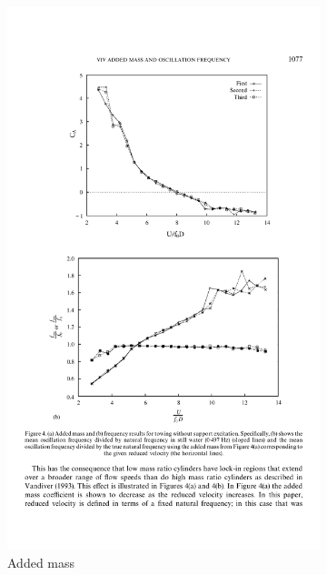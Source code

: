 \begin{figure}[tbp]	
	\centering
	\begin{subfigure}[t]{\linewidth}
		\centering
		\includegraphics[width=0.7\linewidth]{Figs/caur}
		\caption{Added mass}
		\label{fig:caur}
	\end{subfigure}\\%
	\begin{subfigure}[b]{\linewidth}
		\centering

\end{subfigure}
\end{figure}
